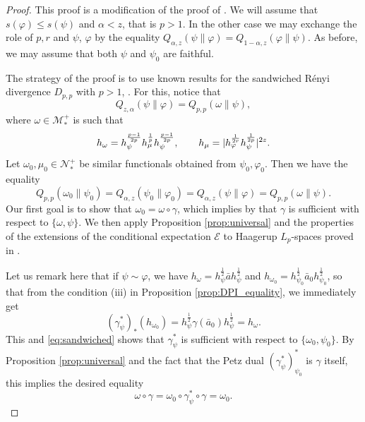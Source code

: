 \documentclass[12pt]{article}
\theoremstyle{definition}
\theoremstyle{remark}
\numberwithin{equation}{section}
\def\cE{\mathcal E}
\def\Me{\mathcal M}
\def\Ne{\mathcal N}
\def\ffi{\varphi}
\begin{document}
\begin{proof} This proof is a modification of the proof of \cite[Thm.
5.1]{jencova2021renyi}.  
We will assume that $s(\ffi)\le s(\psi)$ and $
\alpha<z$, that is $p>1$. In the other case we may exchange the role of $p,r$ and $\psi$, $\ffi$ by the equality
$Q_{\alpha,z}(\psi\|\varphi)=Q_{1-\alpha,z}(\varphi\|\psi)$. As before, we may assume that
both $\psi$ and $\psi_0$ are faithful.

The strategy of the proof is to use known results for the sandwiched R\'enyi divergence
$D_{p,p}$ with $p>1$, \cite[]{jencova2018renyi}. For this, notice that
\[
Q_{z,\alpha}(\psi\|\ffi)=Q_{p,p}(\omega\|\psi),
\]
where $\omega\in \Me_*^+$ is such that
\begin{equation}\label{eq:omega}
h_\omega=h_\psi^{p-1\over 2p}h_\mu^{\frac1p}h_\psi^{p-1\over 2p},\qquad
h_{\mu}=|h_{\ffi}^{1\over 2r}h_{\psi}^{1\over 2p}|^{2z}.
\end{equation}
Let $\omega_0,\mu_0\in \Ne_*^+$ be similar functionals obtained from $\psi_0,\ffi_0$. Then
we have the equality
\begin{equation}\label{eq:sandwiched}
Q_{p,p}(\omega_0\|\psi_0)=Q_{\alpha,z}(\psi_0\|\ffi_0)=Q_{\alpha,z}(\psi\|\ffi)=Q_{p,p}(\omega\|\psi).
\end{equation}
Our first goal is to show that $\omega_0=\omega\circ\gamma$, which implies by
\cite[]{jencova2018renyi} that $\gamma$ is sufficient with respect to $\{\omega,\psi\}$. 
We then apply Proposition \ref{prop:universal} and the properties of the extensions of the
conditional expectation $\cE$ to Haagerup $L_p$-spaces proved in
\cite{junge2003noncommutative}. 


Let us remark here that if $\psi\sim \ffi$, we have
$h_\omega=h_\psi^{\frac12}\bar ah_\psi^{\frac12}$ and
$h_{\omega_0}=h_{\psi_0}^{\frac12}\bar a_0h_{\psi_0}^{\frac12}$, so that from the condition (iii) in Proposition
\ref{prop:DPI_equality}, we immediately get
\[
(\gamma^*_{\psi})_*(h_{\omega_0})=h_\psi^{\frac12}\gamma(\bar
a_0)h_\psi^{\frac12}=h_\omega.
\]
This and \eqref{eq:sandwiched} shows that $\gamma^*_\psi$ is sufficient with respect to
$\{\omega_0,\psi_0\}$. By Proposition \ref{prop:universal} and the fact that the
Petz dual  $(\gamma_\psi^*)_{\psi_0}^*$ is $\gamma$ itself, this implies the desired
equality
\[
\omega\circ\gamma= \omega_0\circ \gamma_\psi^*\circ\gamma=\omega_0.
\]






\end{proof}
\end{document}
